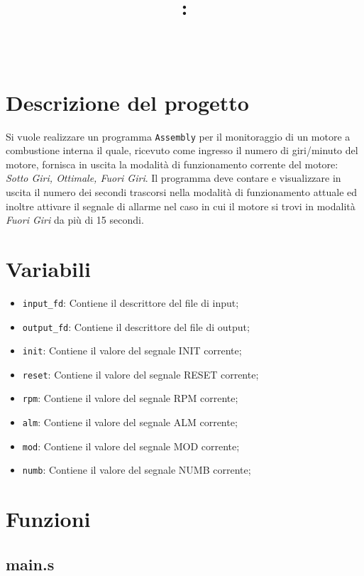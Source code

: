 \documentclass[a4paper,11pt]{article}
\title{
\vspace{2in}
\textmd{\textbf{\hmwkClass:\\ \hmwkTitle}}\\
\vspace{0.1in}\large{\textit{\hmwkAuthorName}}
\vspace{3in}
}
\newcommand{\Assembly}{\texttt{Assembly} }
\begin{document}
	\maketitle
	\newpage
	\tableofcontents
	\newpage
	
	\section{Descrizione del progetto}
	Si vuole realizzare un programma \Assembly per il monitoraggio di un motore a combustione interna il quale, ricevuto come ingresso il numero di giri/minuto del motore, fornisca in uscita la modalità di funzionamento corrente del motore: \textit{Sotto Giri, Ottimale, Fuori Giri}. Il programma deve contare e visualizzare in uscita il numero dei secondi trascorsi nella modalità di funzionamento attuale ed inoltre attivare il segnale di allarme nel caso in cui il motore si trovi in modalità \textit{Fuori Giri} da più di 15 secondi.
	
	\section{Variabili}
	\begin{itemize}
		\item \texttt{input\_fd}: Contiene il descrittore del file di input;
		\item \texttt{output\_fd}: Contiene il descrittore del file di output;
		\item \texttt{init}: Contiene il valore del segnale INIT corrente;
		\item \texttt{reset}: Contiene il valore del segnale RESET corrente;
		\item \texttt{rpm}: Contiene il valore del segnale RPM corrente;
		\item \texttt{alm}: Contiene il valore del segnale ALM corrente;
		\item \texttt{mod}: Contiene il valore del segnale MOD corrente;
		\item \texttt{numb}: Contiene il valore del segnale NUMB corrente;
	\end{itemize}
	
	
	\section{Funzioni}
	
	\subsection{main.s}
\end{document}
